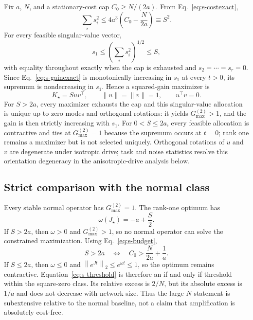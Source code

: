 \documentclass[
  aps,prl,preprint,notitlepage,superscriptaddress,nofootinbib,longbibliography,
  amsmath,amssymb
]{revtex4-2}
\newcommand{\Gmax}{G_{\max}^{(2)}}
\newcommand{\opnorm}[1]{\left\lVert #1\right\rVert_2}
\begin{document}
Fix $a$, $N$, and a stationary-cost cap $C_0\ge N/(2a)$. From
Eq.~\eqref{eq:s-costexact},
\begin{equation}
\sum_i s_i^2\le4a^3\left(C_0-\frac{N}{2a}\right)\equiv S^2.
\label{eq:s-budget}
\end{equation}
For every feasible singular-value vector,
\begin{equation}
s_1\le\left(\sum_i s_i^2\right)^{1/2}\le S,
\end{equation}
with equality throughout exactly when the cap is exhausted and
$s_2=\cdots=s_r=0$. Since
Eq.~\eqref{eq:s-gainexact} is monotonically increasing in $s_1$ at every
$t>0$, its supremum is nondecreasing in $s_1$. Hence a squared-gain maximizer is
\begin{equation}
K_\star=Suv^\top,\qquad \|u\|=\|v\|=1,\qquad u^\top v=0.
\end{equation}
For $S>2a$, every maximizer exhausts the cap and this singular-value allocation
is unique up to zero modes and orthogonal rotations: it yields $\Gmax>1$, and the gain is then
strictly increasing with $s_1$.  For $0<S\le2a$, every feasible allocation is
contractive and ties at $\Gmax=1$ because the supremum occurs at $t=0$; rank
one remains a maximizer but is not selected uniquely.  Orthogonal rotations of
$u$ and $v$ are degenerate under isotropic drive; task and noise statistics
resolve this orientation degeneracy in the anisotropic-drive analysis below.

\subsection{Strict comparison with the normal class}

Every stable normal operator has $\Gmax=1$. The rank-one optimum has
\begin{equation}
\omega(J_\star)=-a+\frac{S}{2}.
\end{equation}
If $S>2a$, then $\omega>0$ and $\Gmax>1$, so no normal operator can solve the
constrained maximization. Using Eq.~\eqref{eq:s-budget},
\begin{equation}
S>2a
\quad\Longleftrightarrow\quad
C_0>\frac{N}{2a}+\frac{1}{a}.
\label{eq:s-threshold}
\end{equation}
If $S\le2a$, then $\omega\le0$ and
$\opnorm{e^{Jt}}\le e^{\omega t}\le1$, so the optimum remains contractive.
Equation~\eqref{eq:s-threshold} is therefore an if-and-only-if threshold within
the square-zero class.  Its relative excess is $2/N$, but its absolute excess is
$1/a$ and does not decrease with network size.  Thus the large-$N$ statement is
subextensive relative to the normal baseline, not a claim that amplification is
absolutely cost-free.
\end{document}
